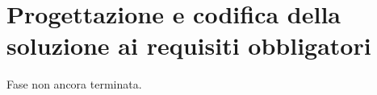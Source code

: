 \section{Progettazione e codifica della soluzione ai requisiti obbligatori}

Fase non ancora terminata.